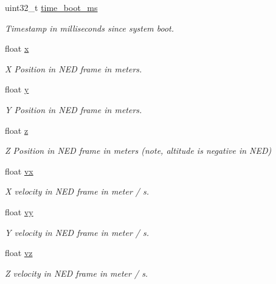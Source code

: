 \begin{DoxyCompactItemize}
\item 
uint32\+\_\+t \hyperlink{struct____mavlink__set__position__target__local__ned__t_a43e26d49abe450f838ed70d09a8588fc}{time\+\_\+boot\+\_\+ms}
\begin{DoxyCompactList}\small\item\em Timestamp in milliseconds since system boot. \end{DoxyCompactList}\item 
float \hyperlink{struct____mavlink__set__position__target__local__ned__t_a06eb678a4cc1cf451ea125e0d4326093}{x}
\begin{DoxyCompactList}\small\item\em X Position in N\+E\+D frame in meters. \end{DoxyCompactList}\item 
float \hyperlink{struct____mavlink__set__position__target__local__ned__t_afb5723437f0b52502c25498506a4299a}{y}
\begin{DoxyCompactList}\small\item\em Y Position in N\+E\+D frame in meters. \end{DoxyCompactList}\item 
float \hyperlink{struct____mavlink__set__position__target__local__ned__t_a276f6a7fdc80c385541069f66beb267f}{z}
\begin{DoxyCompactList}\small\item\em Z Position in N\+E\+D frame in meters (note, altitude is negative in N\+E\+D) \end{DoxyCompactList}\item 
float \hyperlink{struct____mavlink__set__position__target__local__ned__t_aa2f16a6eee70ac5bb8b06c5357e625cc}{vx}
\begin{DoxyCompactList}\small\item\em X velocity in N\+E\+D frame in meter / s. \end{DoxyCompactList}\item 
float \hyperlink{struct____mavlink__set__position__target__local__ned__t_a5b62a9ce5ad589276c7d132522877952}{vy}
\begin{DoxyCompactList}\small\item\em Y velocity in N\+E\+D frame in meter / s. \end{DoxyCompactList}\item 
float \hyperlink{struct____mavlink__set__position__target__local__ned__t_a7e7701aafb94bd3a9c4c679dbd28f92f}{vz}
\begin{DoxyCompactList}\small\item\em Z velocity in N\+E\+D frame in meter / s. \end{DoxyCompactList}\item 

\end{DoxyCompactItemize}
